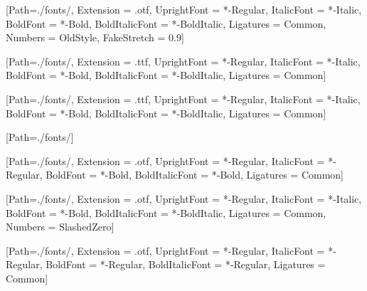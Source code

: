 [Path=./fonts/,
  Extension      = .otf,
  UprightFont    = *-Regular,
  ItalicFont     = *-Italic,
  BoldFont       = *-Bold,
  BoldItalicFont = *-BoldItalic,
  Ligatures       = Common,
  Numbers         = OldStyle,
  FakeStretch     = 0.9]



[Path=./fonts/,
  Extension      = .ttf,
  UprightFont    = *-Regular,
  ItalicFont     = *-Italic,
  BoldFont       = *-Bold,
  BoldItalicFont = *-BoldItalic,
  Ligatures      = Common]


[Path=./fonts/,
  Extension      = .ttf,
  UprightFont    = *-Regular,
  ItalicFont     = *-Italic,
  BoldFont       = *-Bold,
  BoldItalicFont = *-BoldItalic,
  Ligatures      = Common]

[Path=./fonts/]

[Path=./fonts/,
  Extension      = .otf,
  UprightFont    = *-Regular,
  ItalicFont     = *-Regular,
  BoldFont       = *-Bold,
  BoldItalicFont = *-Bold,
  Ligatures      = Common]

[Path=./fonts/,
  Extension      = .otf,
  UprightFont    = *-Regular,
  ItalicFont     = *-Italic,
  BoldFont       = *-Bold,
  BoldItalicFont = *-BoldItalic,
  Ligatures       = Common,
  Numbers         = SlashedZero]

[Path=./fonts/,
  Extension      = .otf,
  UprightFont    = *-Regular,
  ItalicFont     = *-Regular,
  BoldFont       = *-Regular,
  BoldItalicFont = *-Regular,
  Ligatures       = Common]
